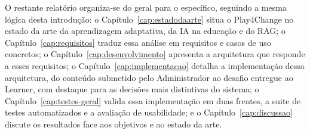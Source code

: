 O restante relatório organiza-se do geral para o específico, seguindo a mesma lógica desta introdução: o Capítulo~\ref{cap:estadodaarte} situa o Play4Change no estado da arte da aprendizagem adaptativa, da IA na educação e do RAG; o Capítulo~\ref{cap:requisitos} traduz essa análise em requisitos e casos de uso concretos; o Capítulo~\ref{cap:desenvolvimento} apresenta a arquitetura que responde a esses requisitos; o Capítulo~\ref{cap:implementacao} detalha a implementação dessa arquitetura, do conteúdo submetido pelo Administrador ao desafio entregue ao Learner, com destaque para as decisões mais distintivas do sistema; o Capítulo~\ref{cap:testes-geral} valida essa implementação em duas frentes, a suite de testes automatizados e a avaliação de usabilidade; e o Capítulo~\ref{cap:discussao} discute os resultados face aos objetivos e ao estado da arte.